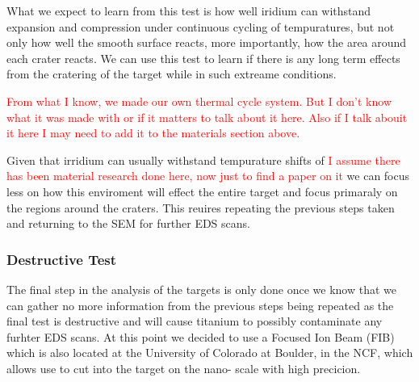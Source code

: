 \documentclass[review]{elsarticle}
\begin{document}
			What we expect to learn from this test is how well iridium can withstand expansion and compression under continuous cycling of tempuratures, but not only how well 
			the smooth surface reacts, more importantly, how the area around each crater reacts. We can use this test to learn if there is any long term effects from the cratering
			of the target while in such extreame conditions. 

			\textcolor{red}{From what I know, we made our own thermal cycle system. But I don't know what it was made with or if it matters to talk about it here. Also if I talk abouit it here
			I may need to add it to the materials section above.} 

			Given that irridium can usually withstand tempurature shifts of \textcolor{red}{I assume there has been material research done here, now just to find a paper on it} we can
			focus less on how this enviroment will effect the entire target and focus primaraly on the regions around the craters. This reuires repeating the previous steps taken and 
			returning to the SEM for further EDS scans. 

			\subsubsection{Destructive Test}
			The final step in the analysis of the targets is only done once we know that we can gather no more information from the previous steps being repeated as the final
			test is destructive and will cause titanium to possibly contaminate any furhter EDS scans. At this point we decided to use a Focused Ion Beam (FIB) which is also located
			at the University of Colorado at Boulder, in the NCF, which allows use to cut into the target on the nano- scale with high precicion.
\end{document}
